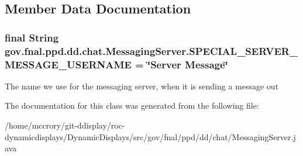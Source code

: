\subsection{Member Data Documentation}
\hypertarget{classgov_1_1fnal_1_1ppd_1_1dd_1_1chat_1_1MessagingServer_a738da0a18944421491268d2220a3c7a4}{
\subsubsection[{S\-P\-E\-C\-I\-A\-L\-\_\-\-S\-E\-R\-V\-E\-R\-\_\-\-M\-E\-S\-S\-A\-G\-E\-\_\-\-U\-S\-E\-R\-N\-A\-M\-E}]{\setlength{\rightskip}{0pt plus 5cm}final String gov.\-fnal.\-ppd.\-dd.\-chat.\-Messaging\-Server.\-S\-P\-E\-C\-I\-A\-L\-\_\-\-S\-E\-R\-V\-E\-R\-\_\-\-M\-E\-S\-S\-A\-G\-E\-\_\-\-U\-S\-E\-R\-N\-A\-M\-E = \char`\"{}Server Message\char`\"{}\hspace{0.3cm}{\ttfamily [static]}}}\label{classgov_1_1fnal_1_1ppd_1_1dd_1_1chat_1_1MessagingServer_a738da0a18944421491268d2220a3c7a4}
The name we use for the messaging server, when it is sending a message out 

The documentation for this class was generated from the following file\-:\begin{DoxyCompactItemize}
\item 
/home/mccrory/git-\/ddisplay/roc-\/dynamicdisplays/\-Dynamic\-Displays/src/gov/fnal/ppd/dd/chat/Messaging\-Server.\-java\end{DoxyCompactItemize}
